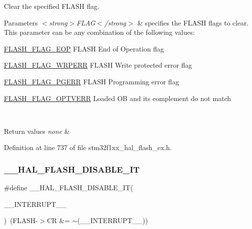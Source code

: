 Clear the specified F\+L\+A\+SH flag. 


\begin{DoxyParams}{Parameters}
{\em $<$strong$>$\+F\+L\+A\+G$<$/strong$>$} & specifies the F\+L\+A\+SH flags to clear. This parameter can be any combination of the following values\+: \begin{DoxyItemize}
\item \hyperlink{group___f_l_a_s_h___flag__definition_gaf043ba4d8f837350bfc7754a99fae5a9}{F\+L\+A\+S\+H\+\_\+\+F\+L\+A\+G\+\_\+\+E\+OP} F\+L\+A\+SH End of Operation flag \item \hyperlink{group___f_l_a_s_h___flag__definition_ga6abf64f916992585899369166db3f266}{F\+L\+A\+S\+H\+\_\+\+F\+L\+A\+G\+\_\+\+W\+R\+P\+E\+RR} F\+L\+A\+SH Write protected error flag \item \hyperlink{group___f_l_a_s_h___flag__definition_gae2ef62dee0a5ca01e6226746039b6f20}{F\+L\+A\+S\+H\+\_\+\+F\+L\+A\+G\+\_\+\+P\+G\+E\+RR} F\+L\+A\+SH Programming error flag \item \hyperlink{group___f_l_a_s_h___flag__definition_gacb2c4c991a260c3f110cd8c72f302864}{F\+L\+A\+S\+H\+\_\+\+F\+L\+A\+G\+\_\+\+O\+P\+T\+V\+E\+RR} Loaded OB and its complement do not match \end{DoxyItemize}
\\
\hline
\end{DoxyParams}

\begin{DoxyRetVals}{Return values}
{\em none} & \\
\hline
\end{DoxyRetVals}


Definition at line 737 of file stm32f1xx\+\_\+hal\+\_\+flash\+\_\+ex.\+h.

\mbox{\label{group___f_l_a_s_h___interrupt_ga1f40f507b5d4b3a4da68e4244a1097ee}} 
\subsubsection{\texorpdfstring{\+\_\+\+\_\+\+H\+A\+L\+\_\+\+F\+L\+A\+S\+H\+\_\+\+D\+I\+S\+A\+B\+L\+E\+\_\+\+IT}{\_\_HAL\_FLASH\_DISABLE\_IT}}
{\footnotesize\ttfamily \#define \+\_\+\+\_\+\+H\+A\+L\+\_\+\+F\+L\+A\+S\+H\+\_\+\+D\+I\+S\+A\+B\+L\+E\+\_\+\+IT(\begin{DoxyParamCaption}\item[{}]{\+\_\+\+\_\+\+I\+N\+T\+E\+R\+R\+U\+P\+T\+\_\+\+\_\+ }\end{DoxyParamCaption})~(F\+L\+A\+SH-\/$>$CR \&= $\sim$(\+\_\+\+\_\+\+I\+N\+T\+E\+R\+R\+U\+P\+T\+\_\+\+\_\+))}



